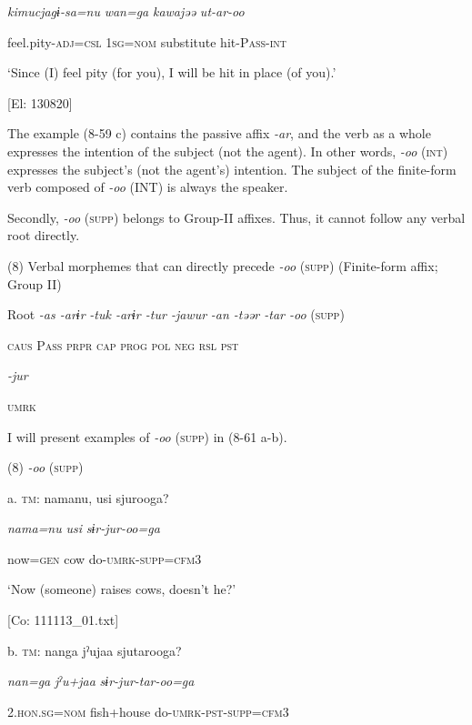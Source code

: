       \textit{kimucjagɨ-sa=nu}  \textit{wan=ga}  \textit{kawajəə}  \textit{ut-ar-oo}

      feel.pity-\textsc{adj}=\textsc{csl}  1\textsc{sg}=\textsc{nom}  substitute  hit-P\textsc{ass}-\textsc{int}

      ‘Since (I) feel pity (for you), I will be hit in place (of you).’

      [El: 130820]

The example (8-59 c) contains the passive affix \textit{{}-ar}, and the verb as a whole expresses the intention of the subject (not the agent). In other words, \textit{{}-oo} (\textsc{int}) expresses the subject’s (not the agent’s) intention. The subject of the finite-form verb composed of \textit{{}-oo} (INT) is always the speaker.

  Secondly, \textit{{}-oo} (\textsc{supp}) belongs to Group-II affixes. Thus, it cannot follow any verbal root directly.

(8)  Verbal morphemes that can directly precede \textit{-oo} (\textsc{supp}) (Finite-form affix; Group II)

  Root  \textit{{}-as  {}-arɨr} %
\textit{{}-tuk  {}-arɨr  {}-tur  {}-jawur} %
\textit{{}-an  {}-təər  {}-tar  {}-oo} (\textsc{supp})

    \textsc{caus}  P\textsc{ass}  \textsc{prpr}  \textsc{cap}  \textsc{prog}  \textsc{pol}  \textsc{neg}  \textsc{rsl}  \textsc{pst}

          \textit{{}-jur} 

          \textsc{umrk}

I will present examples of \textit{{}-oo} (\textsc{supp}) in (8-61 a-b).

(8)  \textit{{}-oo} (\textsc{supp})

  a.  \textsc{tm}:  namanu,  usi  sjurooga?

      \textit{nama=nu}  \textit{usi}  \textit{sɨr-jur-oo=ga}

      now=\textsc{gen}  cow  do-\textsc{umrk}-\textsc{supp}=\textsc{cfm}3

      ‘Now (someone) raises cows, doesn’t he?’

      [Co: 111113\_01.txt]

  b.  \textsc{tm}:  nanga  jˀujaa  sjutarooga?

      \textit{nan=ga}  \textit{jˀu+jaa}  \textit{sɨr-jur-tar-oo=ga}

      2.\textsc{hon}.\textsc{sg}=\textsc{nom}  fish+house  do-\textsc{umrk}-\textsc{pst}-\textsc{supp}=\textsc{cfm}3

